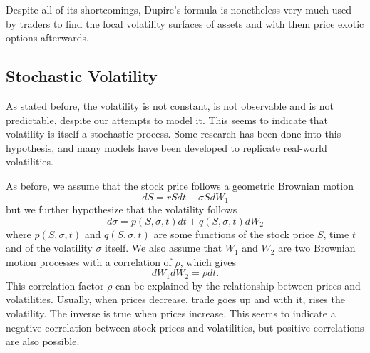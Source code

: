Despite all of its shortcomings, Dupire's formula is nonetheless very much used by traders to find the local volatility surfaces of assets and with them price exotic options afterwards.

\subsection{Stochastic Volatility}
\label{subsection:stochastic volatility}
As stated before, the volatility is not constant, is not observable and is not predictable, despite our attempts to model it. This seems to indicate that volatility is itself a stochastic process. Some research has been done into this hypothesis, and many models have been developed to replicate real-world volatilities.

As before, we assume that the stock price follows a geometric Brownian motion
\begin{equation}
dS=rSdt+\sigma SdW_1
\end{equation}
\noindent but we further hypothesize that the volatility follows
\begin{equation}
d\sigma=p(S,\sigma,t)dt+q(S,\sigma,t)dW_2
\end{equation}
\noindent where $p(S,\sigma,t)$ and $q(S,\sigma,t)$ are some functions of the stock price $S$, time $t$ and of the volatility $\sigma$ itself. We also assume that $W_1$ and $W_2$ are two Brownian motion processes with a correlation of $\rho$, which gives
\begin{equation}
dW_1dW_2=\rho dt.
\end{equation}
\noindent This correlation factor $\rho$ can be explained by the relationship between prices and volatilities. Usually, when prices decrease, trade goes up and with it, rises the volatility. The inverse is true when prices increase. This seems to indicate a negative correlation between stock prices and volatilities, but positive correlations are also possible.

\iffalse
\hl{This correlation can be explained by the relationship between prices and volatilities.} As an example, we can consider a stock that costs \textdollar100 and changes by \textdollar0.10 daily. We can estimate, even without calculations, that it is very stable and thus has a low volatility.
On the other hand if another stock costs \textdollar1 and changes by \textdollar0.10 in a day, we can see that it is extremely volatile even though it changed by the same amount as the first. With this example, we can see that the volatility has some correlation with the stock price.
\fi

